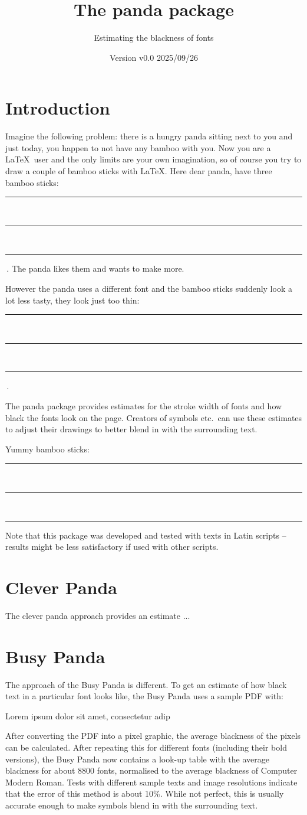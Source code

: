 \documentclass{scrartcl}
\title{The panda package}
\subtitle{Estimating the blackness of fonts}
\author{%
  \texorpdfstring{
   \begin{tikzpicture}
     \colorlet{black}{samdgray}
     \panda
   \end{tikzpicture}\\[0.8em]
   \texttt{samcarter}\\
   \url{https://github.com/samcarter/panda}\\
  }{samcarter}}
\date{Version v0.0 \textendash{} 2025/09/26}
\newcommand{\bamboo}{%
  \rule{%
    \busyPanda{0.125}\fontcharht\font`I
  }{%
    \fontcharht\font`I
  }%
}
\newcommand{\badbamboo}[2]{%
  \rule{#1}{#2}\,\rule{#1}{#2}\,\rule{#1}{#2}%
}
\begin{document}
\maketitle

\section{Introduction}
\label{intro}

Imagine the following problem:
there is a hungry panda sitting next to you and just today, you happen to not have any bamboo with you.
Now you are a \LaTeX\ user and the only limits are your own imagination, so of course you try to draw a couple of bamboo sticks with \LaTeX.
Here dear panda, have three bamboo sticks: \badbamboo{0.8pt}{\fontcharht\font`I}\,.
The panda likes them and wants to make more.
{\selectfont However the panda uses a different font and the bamboo sticks suddenly look a lot less tasty, they look just too thin: \badbamboo{0.8pt}{\fontcharht\font`I}\,.}

The panda package provides estimates for the stroke width of fonts and how black the fonts look on the page.
Creators of symbols etc.\ can use these estimates to adjust their drawings to better blend in with the surrounding text.

{\selectfont Yummy bamboo sticks: \bamboo\,\bamboo\,\bamboo}

Note that this package was developed and tested with texts in Latin scripts -- results might be less satisfactory if used with other scripts.

\blurb*

\section{Clever Panda}

The clever panda approach provides an estimate ...

\clearpage
\section{Busy Panda}

The approach of the Busy Panda is different.
To get an estimate of how black text in a particular font looks like, the Busy Panda uses a sample PDF with:
\begin{center}
\ttfamily Lorem ipsum dolor sit amet, consectetur adip
\end{center}
After converting the PDF into a pixel graphic, the average blackness of the pixels can be calculated.
After repeating this for different fonts (including their bold versions), the Busy Panda now contains a look-up table with the average blackness for about 8800 fonts, normalised to the average blackness of Computer Modern Roman.
Tests with different sample texts and image resolutions indicate that the error of this method is about 10\%.
While not perfect, this is usually accurate enough to make symbols blend in with the surrounding text.
\end{document}
